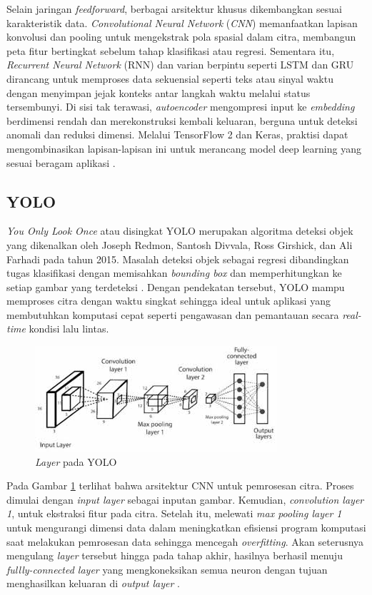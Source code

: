 Selain jaringan \emph{feedforward}, berbagai arsitektur khusus dikembangkan sesuai karakteristik data. \emph{Convolutional Neural Network} (\emph{CNN}) memanfaatkan lapisan konvolusi dan pooling untuk mengekstrak pola spasial dalam citra, membangun peta fitur bertingkat sebelum tahap klasifikasi atau regresi. Sementara itu, \emph{Recurrent Neural Network} (RNN) dan varian berpintu seperti LSTM dan GRU dirancang untuk memproses data sekuensial seperti teks atau sinyal waktu dengan menyimpan jejak konteks antar langkah waktu melalui status tersembunyi. Di sisi tak terawasi, \emph{autoencoder} mengompresi input ke \emph{embedding} berdimensi rendah dan merekonstruksi kembali keluaran, berguna untuk deteksi anomali dan reduksi dimensi. Melalui TensorFlow 2 dan Keras, praktisi dapat mengombinasikan lapisan-lapisan ini untuk merancang model deep learning yang sesuai beragam aplikasi \cite{Geron2019}.

\subsection{YOLO}
\emph{You Only Look Once} atau disingkat YOLO merupakan algoritma deteksi objek yang dikenalkan oleh Joseph Redmon, Santosh Divvala, Ross Girshick, dan Ali Farhadi pada tahun 2015. Masalah deteksi objek sebagai regresi dibandingkan tugas klasifikasi dengan memisahkan \emph{bounding box} dan memperhitungkan ke setiap gambar yang terdeteksi \cite{yoloweb}. Dengan pendekatan tersebut, YOLO mampu memproses citra dengan waktu singkat sehingga ideal untuk aplikasi yang membutuhkan komputasi cepat seperti pengawasan dan pemantauan secara \emph{real-time} kondisi lalu lintas.

\begin{figure} [H] \centering
  \includegraphics[scale=0.7]{bab2/yolo.jpeg}
  \caption{\emph{Layer} pada YOLO}
  \label{fig:layeryolo}
\end{figure}

Pada Gambar \ref{fig:layeryolo} terlihat bahwa arsitektur CNN untuk pemrosesan citra. Proses dimulai dengan \emph{input layer} sebagai inputan gambar. Kemudian, \emph{convolution layer 1}, untuk ekstraksi fitur pada citra. Setelah itu, melewati \emph{max pooling layer 1} untuk mengurangi dimensi data dalam meningkatkan efisiensi program komputasi saat melakukan pemrosesan data sehingga mencegah \emph{overfitting}. Akan seterusnya mengulang \emph{layer} tersebut hingga pada tahap akhir, hasilnya berhasil menuju \emph{fullly-connected layer} yang mengkoneksikan semua neuron dengan tujuan menghasilkan keluaran di \emph{output layer} \cite{layercnn}.

